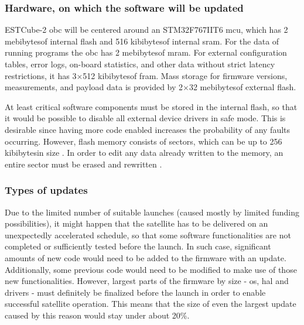 \subsubsection{Hardware, on which the software will be updated}\label{s:hardware}

ESTCube-2 \gls{obc} will be centered around an STM32F767IIT6 \gls{mcu}, which has 2 mebibytes\footnotemark of internal flash and 516 kibibytes\footnotemark[\value{footnote}] of internal \gls{sram}. For the data of running programs the \gls{obc} has 2 mebibytes\footnotemark[\value{footnote}] of \gls{mram}. For external configuration tables, error logs, on-board statistics, and other data without strict latency restrictions, it has 3$\times$512 kibibytes\footnotemark[\value{footnote}] of \gls{fram}. Mass storage for firmware versions, measurements, and payload data is provided by 2$\times$32 mebibytes\footnotemark[\value{footnote}] of external flash.
\cite{Haljaste2017}

At least critical software components must be stored in the internal flash, so that it would be possible to disable all external device drivers in safe mode. This is desirable since having more code enabled increases the probability of any faults occurring. However, flash memory consists of sectors, which can be up to 256 kibibytes\footnotemark[\value{footnote}] in size \cite{STMicroelectronics2018}. In order to edit any data already written to the memory, an entire sector must be erased and rewritten \cite{STMicroelectronics2018}.


\subsubsection{Types of updates}

Due to the limited number of suitable launches (caused mostly by limited funding possibilities), it might happen that the satellite has to be delivered on an unexpectedly accelerated schedule, so that some software functionalities are not completed or sufficiently tested before the launch. In such case, significant amounts of new code would need to be added to the firmware with an update. Additionally, some previous code would need to be modified to make use of those new functionalities. However, largest parts of the firmware by size - \gls{os}, \gls{hal} and drivers - must definitely be finalized before the launch in order to enable successful satellite operation. This means that the size of even the largest update caused by this reason would stay under about 20\%.

